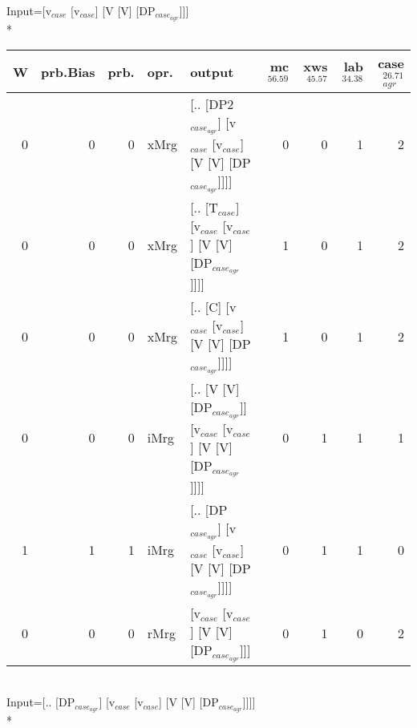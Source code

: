 \begingroup\scriptsize Input=[v$_{case}$ [v$_{case}$] [V [V] [DP$_{case_{agr}}$]]]\\*
\begin{tabularx}{\linewidth}{rrrlXrrrr}
\hline
   W &   prb.Bias &   prb. & opr.   & output                                                             &   mc$^{56.59}$ &   xws$^{45.57}$ &   lab$^{34.38}$ &   case$_{agr}^{26.71}$ \\
\hline
   0 &       0 &   0 & xMrg & [.. [DP2$_{case_{agr}}$] [v$_{case}$ [v$_{case}$] [V [V] [DP$_{case_{agr}}$]]]]        &            0 &             0 &             1 &                  2 \\
   0 &       0 &   0 & xMrg & [.. [T$_{case}$] [v$_{case}$ [v$_{case}$] [V [V] [DP$_{case_{agr}}$]]]]              &            1 &             0 &             1 &                  2 \\
   0 &       0 &   0 & xMrg & [.. [C] [v$_{case}$ [v$_{case}$] [V [V] [DP$_{case_{agr}}$]]]]                   &            1 &             0 &             1 &                  2 \\
   0 &       0 &   0 & iMrg & [.. [V [V] [DP$_{case_{agr}}$]] [v$_{case}$ [v$_{case}$] [V [V] [DP$_{case_{agr}}$]]]] &            0 &             1 &             1 &                  1 \\
   1 &       1 &   1 & iMrg & [.. [DP$_{case_{agr}}$] [v$_{case}$ [v$_{case}$] [V [V] [DP$_{case_{agr}}$]]]]         &            0 &             1 &             1 &                  0 \\
   0 &       0 &   0 & rMrg & [v$_{case}$ [v$_{case}$] [V [V] [DP$_{case_{agr}}$]]]                            &            0 &             1 &             0 &                  2 \\
\hline
\end{tabularx}\endgroup\\
\begingroup\scriptsize Input=[.. [DP$_{case_{agr}}$] [v$_{case}$ [v$_{case}$] [V [V] [DP$_{case_{agr}}$]]]]\\*
